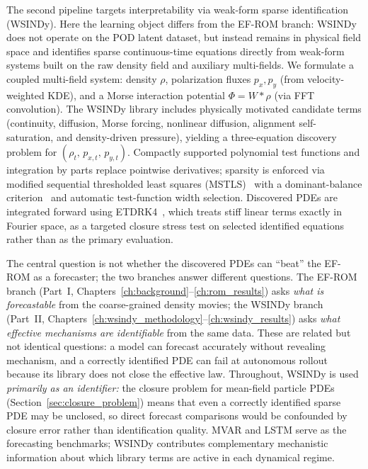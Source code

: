 The second pipeline targets interpretability via weak-form sparse identification (WSINDy). Here the learning object differs from the EF-ROM branch: WSINDy does not operate on the POD latent dataset, but instead remains in physical field space and identifies sparse continuous-time equations directly from weak-form systems built on the raw density field and auxiliary multi-fields. We formulate a coupled multi-field system: density $\rho$, polarization fluxes $p_x, p_y$ (from velocity-weighted KDE), and a Morse interaction potential $\Phi = W\ast\rho$ (via FFT convolution). The WSINDy library includes physically motivated candidate terms (continuity, diffusion, Morse forcing, nonlinear diffusion, alignment self-saturation, and density-driven pressure), yielding a three-equation discovery problem for $(\rho_t,\, p_{x,t},\, p_{y,t})$. Compactly supported polynomial test functions and integration by parts replace pointwise derivatives; sparsity is enforced via modified sequential thresholded least squares (MSTLS)~\cite{minor2025mstls} with a dominant-balance criterion~\cite{callaham2021dominant} and automatic test-function width selection. Discovered PDEs are integrated forward using ETDRK4~\cite{cox2002etdrk,kassam2005etdrk4}, which treats stiff linear terms exactly in Fourier space, as a targeted closure stress test on selected identified equations rather than as the primary evaluation.

The central question is not whether the discovered PDEs can ``beat'' the EF-ROM as a forecaster; the two branches answer different questions.  The EF-ROM branch (Part~I, Chapters~\ref{ch:background}--\ref{ch:rom_results}) asks \emph{what is forecastable} from the coarse-grained density movies; the WSINDy branch (Part~II, Chapters~\ref{ch:wsindy_methodology}--\ref{ch:wsindy_results}) asks \emph{what effective mechanisms are identifiable} from the same data.  These are related but not identical questions: a model can forecast accurately without revealing mechanism, and a correctly identified PDE can fail at autonomous rollout because its library does not close the effective law.  Throughout, WSINDy is used \emph{primarily as an identifier:} the closure problem for mean-field particle PDEs (Section~\ref{sec:closure_problem}) means that even a correctly identified sparse PDE may be unclosed, so direct forecast comparisons would be confounded by closure error rather than identification quality.  MVAR and LSTM serve as the forecasting benchmarks; WSINDy contributes complementary mechanistic information about which library terms are active in each dynamical regime.

